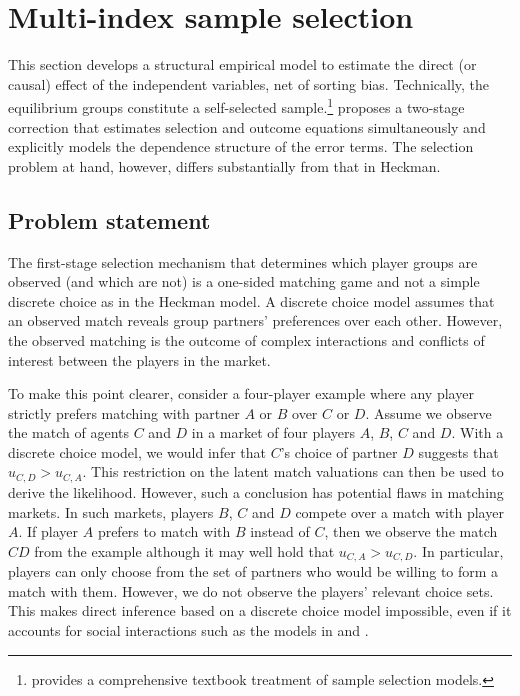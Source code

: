 \section{Multi-index sample selection} \label{Section:Multi-indexSS}

This section develops a structural empirical model to estimate the direct (or causal) effect of the independent variables, net of sorting bias. Technically, the equilibrium groups constitute a self-selected sample.\footnote{\citet[Chapter 17]{Wooldridge2002} provides a comprehensive textbook treatment of sample selection models.} \citet{Heckman1979} proposes a two-stage correction that estimates selection and outcome equations simultaneously and explicitly models the dependence structure of the error terms. The selection problem at hand, however, differs substantially from that in Heckman.


\subsection{Problem statement} 

The first-stage selection mechanism that determines which player groups are observed (and which are not) is a one-sided matching game and not a simple discrete choice as in the Heckman model. A discrete choice model assumes that an observed match reveals group partners' preferences over each other. However, the observed matching is the outcome of complex interactions and conflicts of interest between the players in the market. 

To make this point clearer, consider a four-player example where any player strictly prefers matching with partner $A$ or $B$ over $C$ or $D$. Assume we observe the match of agents $C$ and $D$ in a market of four players $A$, $B$, $C$ and $D$. With a discrete choice model, we would infer that $C$'s choice of partner $D$ suggests that $u_{C,D}>u_{C,A}$. This restriction on the latent match valuations can then be used to derive the likelihood. However, such a conclusion has potential flaws in matching markets. In such markets, players $B$, $C$ and $D$ compete over a match with player $A$. If player $A$ prefers to match with $B$ instead of $C$, then we observe the match $CD$ from the example although it may well hold that $u_{C,A}>u_{C,D}$. In particular, players can only choose from the set of partners who would be willing to form a match with them. However, we do not observe the players' relevant choice sets. This makes direct inference based on a discrete choice model %
impossible, even if it accounts for social interactions such as the models in \citet{Brock2007} and \citet{Ciliberto2009}.



